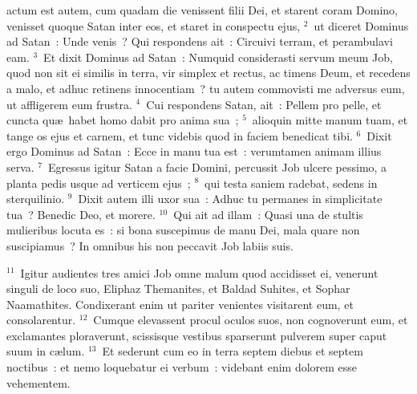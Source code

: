 \bchapter
{}actum est autem, cum quadam die venissent filii Dei, et starent coram Domino, venisset quoque Satan inter eos, et staret in conspectu ejus,
${}^{2}$~ut diceret Dominus ad Satan~: Unde venis~? Qui respondens ait~: Circuivi terram, et perambulavi eam.
${}^{3}$~Et dixit Dominus ad Satan~: Numquid considerasti servum meum Job, quod non sit ei similis in terra, vir simplex et rectus, ac timens Deum, et recedens a malo, et adhuc retinens innocentiam~? tu autem commovisti me adversus eum, ut affligerem eum frustra.
${}^{4}$~Cui respondens Satan, ait~: Pellem pro pelle, et cuncta qu\ae\ habet homo dabit pro anima sua~;
${}^{5}$~alioquin mitte manum tuam, et tange os ejus et carnem, et tunc videbis quod in faciem benedicat tibi.
${}^{6}$~Dixit ergo Dominus ad Satan~: Ecce in manu tua est~: verumtamen animam illius serva.
${}^{7}$~Egressus igitur Satan a facie Domini, percussit Job ulcere pessimo, a planta pedis usque ad verticem ejus~;
${}^{8}$~qui testa saniem radebat, sedens in sterquilinio.
${}^{9}$~Dixit autem illi uxor sua~: Adhuc tu permanes in simplicitate tua~? Benedic Deo, et morere.
${}^{10}$~Qui ait ad illam~: Quasi una de stultis mulieribus locuta es~: si bona suscepimus de manu Dei, mala quare non suscipiamus~? In omnibus his non peccavit Job labiis suis.


${}^{11}$~Igitur audientes tres amici Job omne malum quod accidisset ei, venerunt singuli de loco suo, Eliphaz Themanites, et Baldad Suhites, et Sophar Naamathites. Condixerant enim ut pariter venientes visitarent eum, et consolarentur.
${}^{12}$~Cumque elevassent procul oculos suos, non cognoverunt eum, et exclamantes ploraverunt, scissisque vestibus sparserunt pulverem super caput suum in c\ae lum.
${}^{13}$~Et sederunt cum eo in terra septem diebus et septem noctibus~: et nemo loquebatur ei verbum~: videbant enim dolorem esse vehementem.


